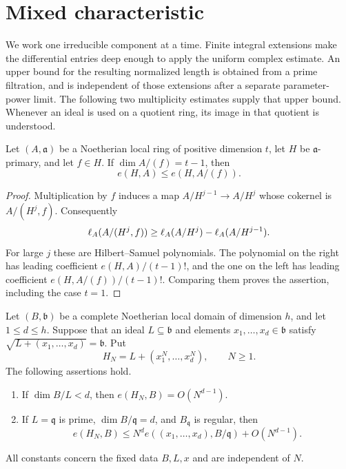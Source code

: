 \section{Mixed characteristic}\label{sec:mixed}

We work one irreducible component at a time. Finite integral extensions
make the differential entries deep enough to apply the uniform complex
estimate. An upper bound for the resulting normalized length is obtained
from a prime filtration, and is independent of those extensions after a
separate parameter-power limit. The following two multiplicity estimates
supply that upper bound. Whenever an
ideal is used on a quotient ring, its image in that quotient is understood.

\begin{lemma}\label{lem:mixed-quotient}
Let $(A,\mathfrak a)$ be a Noetherian local ring of positive dimension
$t$, let $H$ be $\mathfrak a$-primary, and let $f\in H$.  If
$\dim A/(f)=t-1$, then
\[
  e(H,A)\leq e(H,A/(f)).
\]
\end{lemma}

\begin{proof}
Multiplication by $f$ induces a map $A/H^{j-1}\longrightarrow A/H^j$
whose cokernel is $A/(H^j,f)$.  Consequently
\[
 \operatorname{\ell}_A(A/(H^j,f))
 \geq \operatorname{\ell}_A(A/H^j)-\operatorname{\ell}_A(A/H^{j-1}).
\]
For large $j$ these are Hilbert--Samuel polynomials.  The polynomial
on the right has leading coefficient $e(H,A)/(t-1)!$, and the one
on the left has leading coefficient $e(H,A/(f))/(t-1)!$.
Comparing them proves the assertion, including the case $t=1$.
\end{proof}

\begin{lemma}\label{lem:mixed-asymptotic}
Let $(B,\mathfrak b)$ be a complete Noetherian local domain of
dimension $h$, and let $1\leq d\leq h$. Suppose that an ideal
$L\subseteq\mathfrak b$ and elements $x_1,\ldots,x_d\in\mathfrak b$ satisfy
$\sqrt{L+(x_1,\ldots,x_d)}=\mathfrak b$.  Put
\[
 H_N=L+(x_1^N,\ldots,x_d^N),\qquad N\geq1.
\]
The following assertions hold.
\begin{enumerate}
\item If $\dim B/L<d$, then $e(H_N,B)=O(N^{d-1})$.
\item If $L=\mathfrak q$ is prime, $\dim B/\mathfrak q=d$, and
$B_{\mathfrak q}$ is regular, then
\[
 e(H_N,B)\leq N^d e((x_1,\ldots,x_d),B/\mathfrak q)
                 +O(N^{d-1}).
\]
\end{enumerate}
All constants concern the fixed data $B,L,x$ and are independent of $N$.
\end{lemma}

